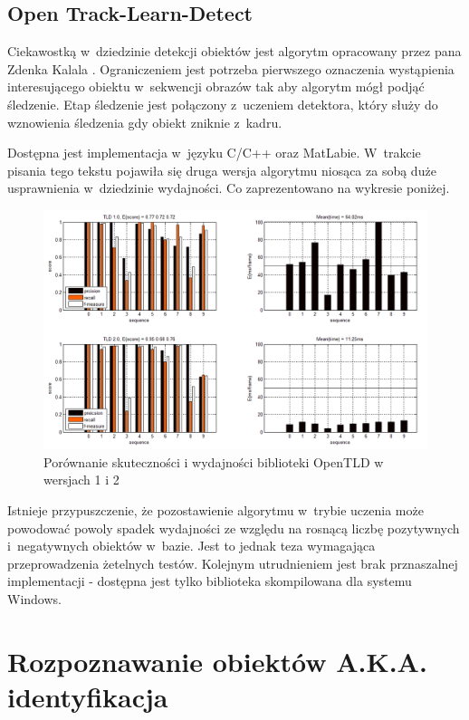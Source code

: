 \subsection{Open Track-Learn-Detect}

Ciekawostką w~dziedzinie detekcji obiektów jest algorytm opracowany przez
pana Zdenka Kalala \cite{DBLP:journals/pami/KalalMM12}.
Ograniczeniem jest potrzeba pierwszego oznaczenia wystąpienia interesującego
obiektu w~sekwencji obrazów tak aby algorytm mógł podjąć śledzenie.
Etap śledzenie jest połączony z~uczeniem detektora, który służy do wznowienia
śledzenia gdy obiekt zniknie z~kadru.

Dostępna jest implementacja w~języku C/C++ oraz MatLabie. W~trakcie
pisania tego tekstu pojawiła się druga wersja algorytmu niosąca
za sobą duże usprawnienia w~dziedzinie wydajności. Co zaprezentowano
na wykresie poniżej.

\begin{figure}[h!]
    \centering
    \includegraphics[width=1\textwidth]{img/rev_open_tld_1_2_comparison}
    \caption{Porównanie skuteczności i wydajności biblioteki OpenTLD w wersjach 1 i 2}
\end{figure}

Istnieje przypuszczenie, że pozostawienie algorytmu w~trybie uczenia
może powodować powoly spadek wydajności ze względu na rosnącą liczbę
pozytywnych i~negatywnych obiektów w~bazie. Jest to jednak teza wymagająca
przeprowadzenia żetelnych testów. Kolejnym utrudnieniem jest brak
prznaszalnej implementacji - dostępna jest tylko biblioteka skompilowana
dla systemu Windows.

\section{Rozpoznawanie obiektów A.K.A. identyfikacja}

